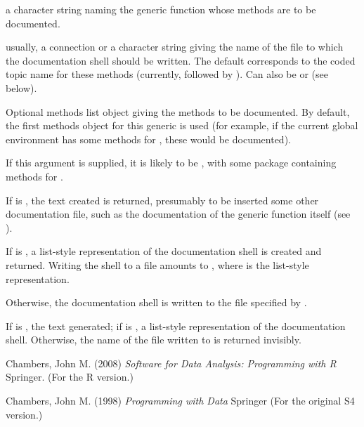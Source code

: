 \begin{Arguments}
\begin{ldescription}
\item[\code{f}] a character string naming the generic function whose methods
are to be documented.
\item[\code{filename}] usually, a connection or a character string giving the
name of the file to which the documentation shell should be written.
The default corresponds to the coded topic name for these methods
(currently,  followed by ).  Can also be
 or  (see below).
\item[\code{methods}] Optional methods list object giving the methods to be
documented.  By default, the first methods object for this generic
is used (for example, if the current global environment has some
methods for , these would be documented).

If this argument is supplied, it is likely to be
, with  some package
containing methods for .
\end{ldescription}
\end{Arguments}
%
\begin{Details}\relax
If  is , the text created is returned,
presumably to be inserted some other documentation file, such as the
documentation of the generic function itself (see
). 

If  is , a list-style representation of the
documentation shell is created and returned.  Writing the shell to a
file amounts to ,
where  is the list-style representation.

Otherwise, the documentation shell is written to the file specified by
.
\end{Details}
%
\begin{Value}
If  is , the text generated;
if  is , a list-style representation of the
documentation shell.
Otherwise, the name of the file written to is returned invisibly.
\end{Value}
%
\begin{References}\relax
Chambers, John M. (2008)
\emph{Software for Data Analysis: Programming with R}
Springer.  (For the R version.)

Chambers, John M. (1998)
\emph{Programming with Data}
Springer (For the original S4 version.)
\end{References}
